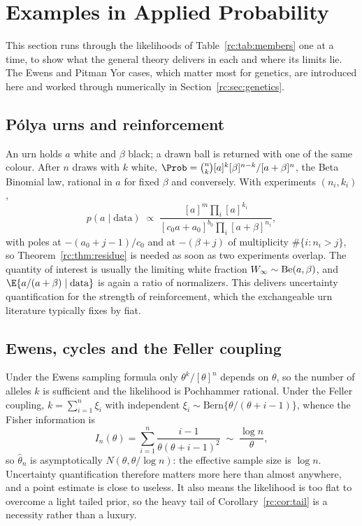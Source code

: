 \section{Examples in Applied Probability}\label{rc:sec:examples}

This section runs through the likelihoods of Table~\ref{rc:tab:members} one at a time, to show what the general theory delivers in each and where its limits lie. The Ewens and Pitman Yor cases, which matter most for genetics, are introduced here and worked through numerically in Section~\ref{rc:sec:genetics}.

\subsection{P\'olya urns and reinforcement}\label{rc:sec:urn}

An urn holds $a$ white and $\beta$ black; a drawn ball is returned with one of the same colour. After $n$ draws with $k$ white, $\Prob=\binom nk[a]^k[\beta]^{n-k}/[a+\beta]^n$, the Beta Binomial law, rational in $a$ for fixed $\beta$ and conversely. With experiments $(n_i,k_i)$,
\[
p(a\mid\text{data})\;\propto\;\frac{[a]^m\prod_i[a]^{k_i}}{[c_0a+a_0]^{b_0}\prod_i[a+\beta]^{n_i}},
\]
with poles at $-(a_0+j-1)/c_0$ and at $-(\beta+j)$ of multiplicity $\#\{i:n_i>j\}$, so Theorem~\ref{rc:thm:residue} is needed as soon as two experiments overlap. The quantity of interest is usually the limiting white fraction $W_\infty\sim\mathrm{Be}(a,\beta)$, and $\E\{a/(a+\beta)\mid\text{data}\}$ is again a ratio of normalizers. This delivers uncertainty quantification for the strength of reinforcement, which the exchangeable urn literature typically fixes by fiat.

\subsection{Ewens, cycles and the Feller coupling}\label{rc:sec:ewens}

Under the Ewens sampling formula \citep{rc:ewens1972} only $\theta^k/[\theta]^n$ depends on $\theta$, so the number of alleles $k$ is sufficient and the likelihood is Pochhammer rational. Under the Feller coupling, $k=\sum_{i=1}^n\xi_i$ with independent $\xi_i\sim\mathrm{Bern}\{\theta/(\theta+i-1)\}$, whence the Fisher information is
\[
I_n(\theta)=\sum_{i=1}^n\frac{i-1}{\theta(\theta+i-1)^2}\;\sim\;\frac{\log n}{\theta},
\]
so $\hat\theta_n$ is asymptotically $N(\theta,\theta/\log n)$: the effective sample size is $\log n$. Uncertainty quantification therefore matters more here than almost anywhere, and a point estimate is close to useless. It also means the likelihood is too flat to overcome a light tailed prior, so the heavy tail of Corollary~\ref{rc:cor:tail} is a necessity rather than a luxury.

